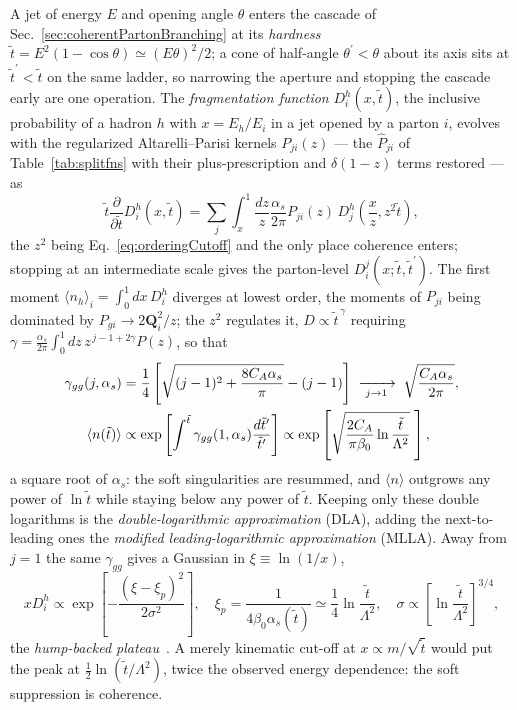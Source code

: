 A jet of energy \(E\) and opening angle \(\theta\) enters the cascade of
Sec.~\ref{sec:coherentPartonBranching} at its \emph{hardness}
\(\tilde{t}=E^2(1-\cos\theta)\simeq(E\theta)^2/2\); a cone of half-angle
\(\theta^\prime<\theta\) about its axis sits at \(\tilde{t}^\prime<\tilde{t}\) on the
same ladder, so narrowing the aperture and stopping the cascade early are one
operation. The \emph{fragmentation function} \(D^h_i(x,\tilde{t})\), the inclusive
probability of a hadron \(h\) with \(x=E_h/E_i\) in a jet opened by a parton \(i\),
evolves with the regularized Altarelli--Parisi kernels \(P_{ji}(z)\) --- the
\(\hat{P}_{ji}\) of Table~\ref{tab:splitfns} with their plus-prescription and
\(\delta(1-z)\) terms restored --- as
\begin{equation}
	\tilde{t}\frac{\partial}{\partial\tilde{t}}D^h_i(x,\tilde{t})
	= \sum_j\int_x^1\frac{dz}{z}\frac{\alpha_s}{2\pi}
	P_{ji}(z)\,D^h_j\!\left(\frac{x}{z}, z^2\tilde{t}\right) ,
	\label{eq:timelikeDglap}
\end{equation}
the \(z^2\) being Eq.~\ref{eq:orderingCutoff} and the only place coherence enters;
stopping at an intermediate scale gives the parton-level
\(D^j_i(x;\tilde{t},\tilde{t}^\prime)\). The first moment
\(\langle n_h\rangle_i=\int_0^1dx\,D^h_i\) diverges at lowest order, the moments of
\(P_{ji}\) being dominated by \(P_{gi}\to2\mathbf{Q}_i^2/z\); the \(z^2\)
regulates it, \(D\propto\tilde{t}^{\,\gamma}\) requiring
\(\gamma=\frac{\alpha_s}{2\pi}\int_0^1dz\,z^{\,j-1+2\gamma}P(z)\), so that
\begin{align}
	\gamma_{gg}(j,\alpha_s) &= \frac{1}{4}\left[
	\sqrt{(j-1)^2 + \frac{8C_A\alpha_s}{\pi}} - (j-1)\right]
	\;\xrightarrow[\;j\to1\;]{}\;
	\sqrt{\frac{C_A\alpha_s}{2\pi}} , \notag\\
	\langle n(\tilde{t})\rangle &\propto
	\exp\left[\int^{\tilde{t}}\gamma_{gg}(1,\alpha_s)
	\frac{d\tilde{t}^\prime}{\tilde{t}^\prime}\right]
	\propto
	\exp\left[\sqrt{\frac{2C_A}{\pi\beta_0}\ln\frac{\tilde{t}}{\Lambda^2}}\;\right] ,
	\label{eq:dlaMultiplicity}
\end{align}
a square root of \(\alpha_s\): the soft singularities are resummed, and
\(\langle n\rangle\) outgrows any power of \(\ln\tilde{t}\) while staying below any
power of \(\tilde{t}\). Keeping only these double logarithms is the
\emph{double-logarithmic approximation} (DLA), adding the next-to-leading ones the
\emph{modified leading-logarithmic approximation} (MLLA). Away from \(j=1\) the same
\(\gamma_{gg}\) gives a Gaussian in \(\xi\equiv\ln(1/x)\),
\begin{equation}
	x D^h_i \propto \exp\left[-\frac{(\xi-\xi_p)^2}{2\sigma^2}\right],
	\quad
	\xi_p = \frac{1}{4\beta_0\alpha_s(\tilde{t})}
	\simeq \frac{1}{4}\ln\frac{\tilde{t}}{\Lambda^2},
	\quad
	\sigma \propto \left[\ln\frac{\tilde{t}}{\Lambda^2}\right]^{3/4} ,
	\label{eq:humpBacked}
\end{equation}
the \emph{hump-backed plateau}~\cite{Azimov_Dokshitzer_Khoze_Troyan_1985}. A merely
kinematic cut-off at \(x\propto m/\sqrt{\tilde{t}}\) would put the peak at
\(\tfrac12\ln(\tilde{t}/\Lambda^2)\), twice the observed energy dependence: the soft
suppression is coherence.

